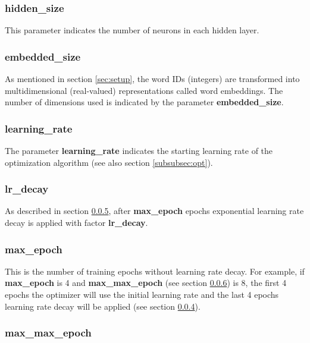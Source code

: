 \documentclass[10pt,a4paper,titlepage]{article}
\begin{document}
\subsubsection{hidden\_size}

This parameter indicates the number of neurons in each hidden layer.

\subsubsection{embedded\_size}

As mentioned in section \ref{sec:setup}, the word IDs (integers) are transformed into multidimensional (real-valued) representations called word embeddings. The number of dimensions used is indicated by the parameter \textbf{embedded\_size}.

\subsubsection{learning\_rate}

The parameter \textbf{learning\_rate} indicates the starting learning rate of the optimization algorithm (see also section \ref{subsubsec:opt}).

\subsubsection{lr\_decay}
\label{subsubsec:decay}

As described in section \ref{subsubsec:max}, after \textbf{max\_epoch} epochs exponential learning rate decay is applied with factor \textbf{lr\_decay}.

\subsubsection{max\_epoch}
\label{subsubsec:max}

This is the number of training epochs without learning rate decay. For example, if \textbf{max\_epoch} is 4 and \textbf{max\_max\_epoch} (see section \ref{subsubsec:maxmax}) is 8, the first 4 epochs the optimizer will use the initial learning rate and the last 4 epochs learning rate decay will be applied (see section \ref{subsubsec:decay}).

\subsubsection{max\_max\_epoch}
\label{subsubsec:maxmax}
\end{document}
